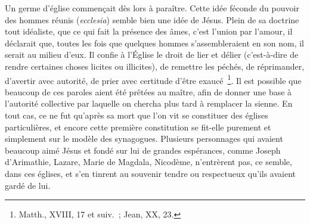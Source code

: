\documentclass[french,twoside]{book} %
\begin{document}
Un germe d’église commençait dès lors à paraître. Cette idée féconde du pouvoir des hommes réunis ({\itshape ecclesia}) semble bien une idée de Jésus. Plein de sa doctrine tout idéaliste, que ce qui fait la présence des âmes, c’est l’union par l’amour, il déclarait que, toutes les fois que quelques hommes s’assembleraient en son nom, il serait au milieu d’eux. Il confie à l’Église le droit de lier et délier (c’est-à-dire de rendre certaines choses licites ou illicites), de remettre les péchés, de réprimander, d’avertir avec autorité, de prier avec certitude d’être exaucé \footnote{Matth., XVIII, 17 et suiv. ; Jean, XX, 23.}. Il est possible que beaucoup de ces paroles aient été prêtées au maître, afin de donner une base à l’autorité collective par laquelle on chercha plus tard à remplacer la sienne. En tout cas, ce ne fut qu’après sa mort que l’on vit se constituer des églises particulières, et encore cette première constitution se fit-elle purement et simplement sur le modèle des synagogues. Plusieurs personnages qui avaient beaucoup aimé Jésus et fondé sur lui de grandes espérances, comme Joseph d’Arimathie, Lazare, Marie de Magdala, Nicodème, n’entrèrent pas, ce semble, dans ces églises, et s’en tinrent au souvenir tendre ou respectueux qu’ils avaient gardé de lui.\par
\end{document}
